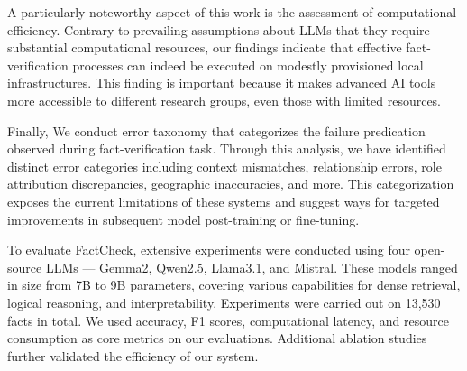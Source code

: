 A particularly noteworthy aspect of this work is the assessment of computational efficiency.
Contrary to prevailing assumptions about LLMs that they require substantial computational resources, our findings indicate that effective fact-verification processes can indeed be executed on modestly provisioned local infrastructures.
This finding is important because it makes advanced AI tools more accessible to different research groups, even those with limited resources.

Finally, We conduct error taxonomy that categorizes the failure predication observed during fact-verification task.
Through this analysis, we have identified distinct error categories including context mismatches, relationship errors, role attribution discrepancies, geographic inaccuracies, and more.
This categorization exposes the current limitations of these systems and suggest ways for targeted improvements in subsequent model post-training or fine-tuning.
%

To evaluate FactCheck, extensive experiments were conducted using four open-source \ac{LLMs} — Gemma2, Qwen2.5, Llama3.1, and Mistral.
These models ranged in size from 7B to 9B parameters, covering various capabilities for dense retrieval, logical reasoning, and interpretability.
Experiments were carried out on 13,530 facts in total.
We used accuracy, F1 scores, computational latency, and resource consumption as core metrics on our evaluations.
Additional ablation studies further validated the efficiency of our system.

